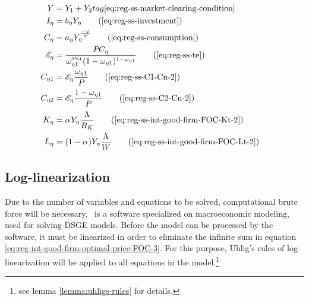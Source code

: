 \documentclass[../thesis.tex]{subfiles}
\begin{document}
\begin{align}
		\\
		Y &= Y_{1} + Y_{2} tag{\ref{eq:reg-ss-market-clearing-condition}}
		\\
		I_{\eta} &= b_{\eta} Y_{\eta} \tag{\ref{eq:reg-ss-investment}}
		\\
		C_{\eta} &= a_{\eta} Y_{\eta}^{\frac{-\varphi}{\sigma}} \tag{\ref{eq:reg-ss-consumption}}
		\\
		\te[] &= \frac{P_{} C_{\eta}}{\omega_{\eta 1}^{\omega_{\eta 1}} (1 -\omega_{\eta 1})^{1 -\omega_{\eta 1}}} \tag{\ref{eq:reg-ss-te}}
		\\
		C_{\eta 1} &= \te[] \frac{\omega_{\eta 1}}{P_{}} \tag{\ref{eq:reg-ss-C1-Cn-2}}
		\\
		C_{\eta 2} &= \te[] \frac{1 -\omega_{\eta 1}}{P_{}} \tag{\ref{eq:reg-ss-C2-Cn-2}}
		\\
		K_{\eta} &= {\alpha_{}} Y_{\eta} \frac{\Lambda_{}}{R_K} \tag{\ref{eq:reg-ss-int-good-firm-FOC-Kt-2}}
		\\
		L_{\eta} &= (1-{\alpha_{}}) Y_{\eta} \frac{\Lambda_{}}{W} \tag{\ref{eq:reg-ss-int-good-firm-FOC-Lt-2}}
	\end{align}

		\begin{comment}
			Y_{1} &= \left[ \left( \frac{a_{1}}{1 - b_{1}} \right) \left( \frac{1}{\omega_{11}^{\omega_{11}} (1 - \omega_{11})^{1 - \omega_{11}}} \right) \right]^{\frac{\sigma}{\sigma + \varphi}} \tag{\ref{eq:reg-ss-total-y1}}
			\\
			Y_{2} &= \left[ \left( \frac{a_{2}}{1 - b_{2}} \right) \left( \frac{1}{\omega_{21}^{\omega_{21}} (1 - \omega_{21})^{1 - \omega_{21}}} \right) \right]^{\frac{\sigma}{\sigma + \varphi}} \tag{\ref{eq:reg-ss-total-y2}}
			\\
		\end{comment}

	\newpage
	
	
\subsection{Log-linearization}
	
	Due to the number of variables and equations to be solved, computational brute force will be necessary. \dynare \ is a software specialized on macroeconomic modeling, used for solving DSGE models. Before the model can be processed by the software, it must be linearized in order to eliminate the infinite sum in equation \ref{eq:reg-int-good-firm-optimal-price-FOC-3}. For this purpose, Uhlig's rules of log-linearization \cite{uhlig_toolkit_1999} will be applied to all equations in the model.\footnote{see lemma \ref{lemma:uhligs-rules} for details.}
\end{document}
